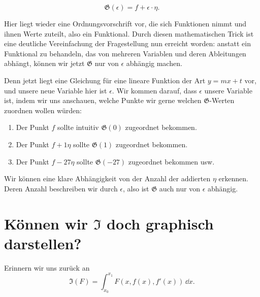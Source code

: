 \begin{equation} \label{funktionalgerade}
 \mathfrak{G}(\epsilon)=f+\epsilon \cdot \eta.
\end{equation}



Hier liegt wieder eine Ordnungsvorschrift vor, die sich Funktionen nimmt und ihnen Werte zuteilt, also ein Funktional. 
Durch diesen mathematischen Trick ist eine deutliche Vereinfachung der Fragestellung nun erreicht worden:
anstatt ein Funktional zu behandeln, das von mehreren Variablen und deren Ableitungen abhängt, können wir jetzt $\mathfrak{G}$ nur von $\epsilon$ abhängig machen.

Denn jetzt liegt eine Gleichung für eine lineare Funktion der Art $y= mx + t$ vor, und unsere neue Variable hier ist $\epsilon$. 
Wir kommen darauf, dass $\epsilon$ unsere Variable ist, indem wir uns anschauen, welche Punkte wir gerne welchen $\mathfrak{G}$-Werten zuordnen wollen würden:

\begin{enumerate}
 \item Der Punkt $f$ sollte intuitiv $\mathfrak{G}(0)$ zugeordnet bekommen.
 \item Der Punkt $f+ 1\eta$ sollte $\mathfrak{G}(1)$ zugeordnet bekommen.
 \item Der Punkt $f-27 \eta$ sollte $\mathfrak{G}(-27)$ zugeordnet bekommen usw.
\end{enumerate}

Wir können eine klare Abhängigkeit von der Anzahl der addierten $\eta$ erkennen. 
Deren Anzahl beschreiben wir durch $\epsilon$, also ist $\mathfrak{G}$ auch nur von $\epsilon$ abhängig.


\section{Können wir $\mathfrak{I}$ doch graphisch darstellen?} \label{Igraphisch}

Erinnern wir uns zurück an 
$$
\mathfrak{I}(F)= \int_{x_0}^{x_1} F\left(x, f(x), f'(x) \right) \,\dd x. 
$$

